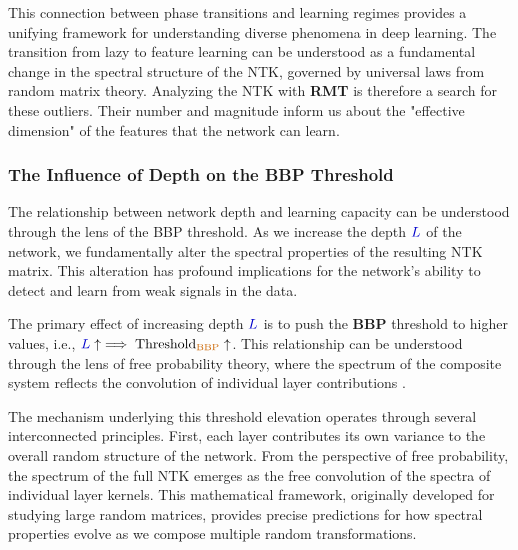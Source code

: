 \documentclass[a4paper]{article}
\theoremstyle{plain}
\theoremstyle{definition}
\theoremstyle{remark}
\begin{document}
This connection between phase transitions and learning regimes provides a unifying framework for understanding diverse phenomena in deep learning. The transition from lazy to feature learning can be understood as a fundamental change in the spectral structure of the NTK, governed by universal laws from random matrix theory. Analyzing the \textcolor{kernelcolor}{NTK} with \textcolor{purple!80!black}{\textbf{RMT}} is therefore a search for these outliers. Their number and magnitude inform us about the "effective dimension" of the features that the network can learn.

\subsubsection{The Influence of Depth on the BBP Threshold}

The relationship between network depth and learning capacity can be understood through the lens of the BBP threshold. As we increase the depth $\textcolor{blue!80!black}{L}$ of the network, we fundamentally alter the spectral properties of the resulting NTK matrix. This alteration has profound implications for the network's ability to detect and learn from weak signals in the data.

\begin{tcolorbox}[colback=green!10,colframe=green!60!black,title={\textbf{🎯 KEY INSIGHT: Depth Effect on Learning Threshold}},enhanced,drop shadow]
The primary effect of increasing depth $\textcolor{blue!80!black}{L}$ is to push the \textcolor{orange!80!black}{\textbf{BBP}} threshold to higher values, i.e., $\textcolor{blue!80!black}{L} \uparrow \implies \text{Threshold}_{\textcolor{orange!80!black}{\text{BBP}}} \uparrow$. This relationship can be understood through the lens of free probability theory, where the spectrum of the composite system reflects the convolution of individual layer contributions \cite{doumeche2023sobolev_ntk}.
\end{tcolorbox}

The mechanism underlying this threshold elevation operates through several interconnected principles. First, each layer contributes its own variance to the overall random structure of the network. From the perspective of free probability, the spectrum of the full \textcolor{kernelcolor}{NTK} emerges as the free convolution of the spectra of individual layer kernels. This mathematical framework, originally developed for studying large random matrices, provides precise predictions for how spectral properties evolve as we compose multiple random transformations.
\end{document}
